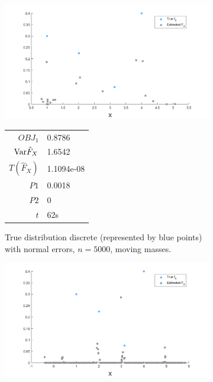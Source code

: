 \begin{figure}
	\centering
	\begin{subfigure}[b]{0.38\textwidth}
		\centering
		\includegraphics[width = \textwidth]{Figures/Deconvolution/moving_masses_discrete_n5000_example.png}
		\begin{tabular}{r l}
			$OBJ_1$ & 0.8786\\
			$\mathrm{Var} \hat{F}_X$ & 1.6542\\
			$T(\hat{F}_X)$ & 1.1094e-08\\
			$P1$ & 0.0018\\
			$P2$ & 0\\
			$t$ & 62s
		\end{tabular}
		\caption{True distribution discrete (represented by blue points) with normal errors, $n = 5000$, moving masses.}
		\label{fig:moving masses discrete}
	\end{subfigure}
	\hfill
	\begin{subfigure}[b]{0.38\textwidth}
		\centering
		\includegraphics[width = \textwidth]{Figures/Deconvolution/fixed_masses_discrete_n5000_example.png}
		\begin{tabular}{r l}

\end{tabular}
\end{subfigure}
\end{figure}
